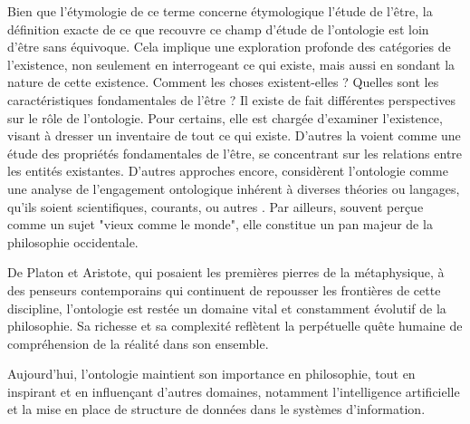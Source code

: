 \documentclass[12pt]{report}
\begin{document}
Bien que l'étymologie de ce terme concerne étymologique l'étude de l'être, la définition exacte de ce que recouvre ce champ d'étude de l'ontologie est loin d'être sans équivoque. Cela implique une exploration profonde des catégories de l'existence, non seulement en interrogeant ce qui existe, mais aussi en sondant la nature de cette existence. Comment les choses existent-elles ? Quelles sont les caractéristiques fondamentales de l'être ? Il existe de fait différentes perspectives sur le rôle de l'ontologie. Pour certains, elle est chargée d'examiner l'existence, visant à dresser un inventaire de tout ce qui existe. D'autres la voient comme une étude des propriétés fondamentales de l'être, se concentrant sur les relations entre les entités existantes. D'autres approches encore, considèrent l'ontologie comme une analyse de l'engagement ontologique inhérent à diverses théories ou langages, qu'ils soient scientifiques, courants, ou autres\autocite{arapinis2018ontologie} .
Par ailleurs, souvent perçue comme un sujet "vieux comme le monde", elle constitue un pan majeur de la philosophie occidentale.

De Platon et Aristote, qui posaient les premières pierres de la métaphysique, à des penseurs contemporains qui continuent de repousser les frontières de cette discipline, l'ontologie est restée un domaine vital et constamment évolutif de la philosophie. Sa richesse et sa complexité reflètent la perpétuelle quête humaine de compréhension de la réalité dans son ensemble.

Aujourd'hui, l'ontologie maintient son importance en philosophie, tout en inspirant et en influençant d'autres domaines, notamment l'intelligence artificielle et la mise en place de structure de données dans le systèmes d'information.
 
\end{document}
